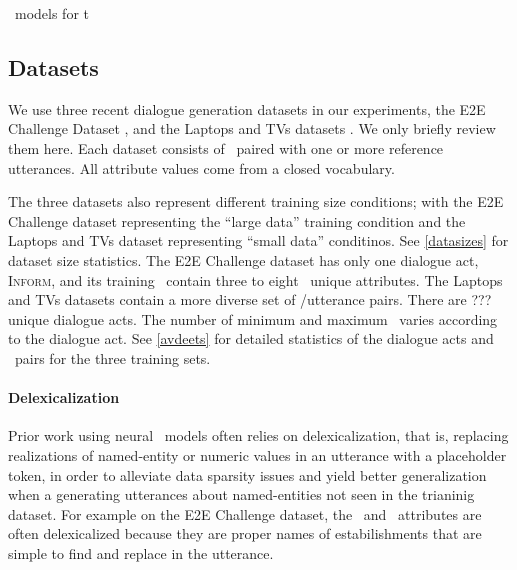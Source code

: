\naturallanguagegeneration~models for t

\subsection{Datasets}

We use three recent dialogue generation datasets in our experiments,
the E2E Challenge Dataset \cite{duvsek2019evaluating}, and the Laptops and 
TVs datasets \cite{wen2016multi}.
We only briefly review them here.
Each dataset consists of \meaningrepresentations~paired with one or more 
reference utterances.
All attribute values 
come from a closed vocabulary.

The three datasets also represent different training size conditions; 
with the E2E Challenge dataset representing the ``large data'' training
condition and the Laptops and TVs dataset representing ``small data'' conditinos. See \autoref{datasizes} for dataset size statistics.
The E2E Challenge dataset has only one dialogue act, \textsc{Inform}, 
and its training \meaningrepresentations~contain three to eight
\attributes~unique attributes. 
The Laptops and TVs datasets contain a more diverse set of \meaningrepresentation/utterance pairs. There are {\color{red}???} unique dialogue acts. 
The number of minimum and maximum \attributes~varies according to the dialogue
act. See \autoref{avdeets} for detailed statistics of the dialogue acts
and \attributevalue~pairs for the three training sets. 


\paragraph{Delexicalization}
Prior work using neural \naturallanguagegeneration~models often relies on 
delexicalization, that is, replacing realizations of named-entity or 
numeric values in an utterance with a placeholder token, in order to alleviate
data sparsity issues and yield better generalization when a generating utterances about named-entities not seen in the trianinig dataset. For example
on the E2E Challenge dataset, the ~and ~attributes
are often delexicalized because they are proper names of estabilishments
that are simple to find and replace in the utterance.

